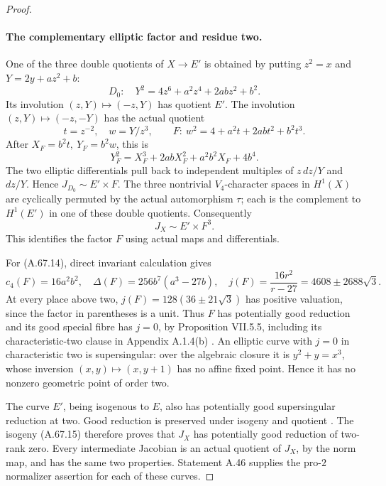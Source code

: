 \begin{proof}
\paragraph{The complementary elliptic factor and residue two.}
One of the three double quotients of \(X\to E'\) is obtained by
putting \(z^2=x\) and \(Y=2y+az^2+b\):
\[
 D_0:\quad Y^2=4z^6+a^2z^4+2abz^2+b^2.
                                                               \tag{A.67.12}
\]
Its involution \((z,Y)\mapsto(-z,Y)\) has quotient \(E'\).
The involution \((z,Y)\mapsto(-z,-Y)\) has the actual quotient
\[
 t=z^{-2},\quad w=Y/z^3,\qquad
 F:\ w^2=4+a^2t+2ab t^2+b^2t^3.
                                                               \tag{A.67.13}
\]
After \(X_F=b^2t,\ Y_F=b^2w\), this is
\[
 Y_F^2=X_F^3+2abX_F^2+a^2b^2X_F+4b^4.
                                                               \tag{A.67.14}
\]
The two elliptic differentials pull back to independent
multiples of \(z\,dz/Y\) and \(dz/Y\). Hence
\(J_{D_0}\sim E'\times F\). The three nontrivial \(V_4\)-character
spaces in \(H^1(X)\) are cyclically permuted by the actual
automorphism \(\tau\); each is the complement to \(H^1(E')\)
in one of these double quotients. Consequently
\[
                         J_X\sim E'\times F^3.
                                                               \tag{A.67.15}
\]
This identifies the factor \(F\) using actual maps and
differentials.

For (A.67.14), direct invariant calculation gives
\[
 c_4(F)=16a^2b^2,\quad
 \Delta(F)=256b^7(a^3-27b),\quad
 j(F)=\frac{16r^2}{r-27}=4608\pm2688\sqrt3.
                                                               \tag{A.67.16}
\]
At every place above two, \(j(F)=128(36\pm21\sqrt3)\) has
positive valuation, since the factor in parentheses is a unit.
Thus \(F\) has potentially good reduction and its good special
fibre has \(j=0\), by Proposition VII.5.5, including its
characteristic-two clause in Appendix A.1.4(b)
\cite[pp.~197, 199]{fghSilvermanAEC}. An elliptic curve with
\(j=0\) in characteristic two is supersingular: over the
algebraic closure it is \(y^2+y=x^3\), whose inversion
\((x,y)\mapsto(x,y+1)\) has no affine fixed point. Hence it has
no nonzero geometric point of order two.

The curve \(E'\), being isogenous to \(E\), also has potentially
good supersingular reduction at two. Good reduction is
preserved under isogeny and quotient
\cite[Theorem 1 and Corollary 2, p.~493]{fghSerreTate1968}.
The isogeny (A.67.15) therefore proves that \(J_X\) has potentially
good reduction of two-rank zero. Every intermediate Jacobian
is an actual quotient of \(J_X\), by the norm map, and has the
same two properties. Statement A.46 supplies the pro-\(2\)
normalizer assertion for each of these curves.


\end{proof}
